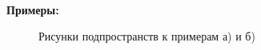 ~\

\noindent\textbf{Примеры:}
\begin{figure}[h]
	\begin{minipage}[h]{0.49\linewidth}
	\end{minipage}
	\hfill
	\begin{minipage}[h]{0.49\linewidth}
	\end{minipage}
	\caption{Рисунки подпространств к примерам а) и б)}
	\label{ris:image1}
\end{figure}

